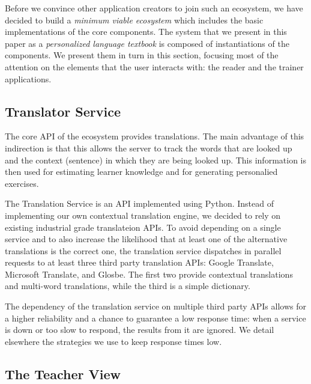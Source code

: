 

Before we convince other application creators to join such an ecosystem, we have decided to build a {\em minimum viable ecosystem} which includes the basic implementations of the core components. The system that we present in this paper as a {\em personalized language textbook} is composed of instantiations of the components. We present them in turn in this section, focusing most of the attention on the elements that the user interacts with: the reader and the trainer applications. 









\subsection{Translator Service}

The core API of the ecosystem provides translations. The main advantage of this indirection is that this allows the server to track the words that are looked up and the context (sentence) in which they are being looked up. This information is then used for estimating learner knowledge and for generating personalied exercises. 

The Translation Service is an API implemented using Python. Instead of implementing our own contextual translation engine, we decided to rely on existing industrial grade translateion APIs. To avoid depending on a single service and to also increase the likelihood that at least one of the alternative translations is the correct one, the translation service dispatches in parallel requests to at least three third party translation APIs: Google Translate, Microsoft Translate, and Glosbe. \cite{Jager17-mux} The first two provide contextual translations and multi-word translations, while the third is a simple dictionary. 

The dependency of the translation service on multiple third party APIs allows for a higher reliability and a chance to guarantee a low response time: when a service is down or too slow to respond, the results from it are ignored. We detail elsewhere the strategies we use to keep response times low\cite{Jager17-mux}.

\subsection{The Teacher View}

